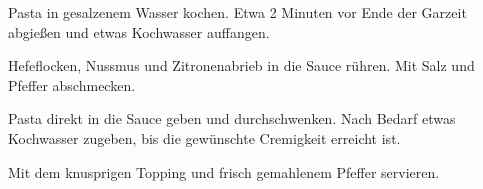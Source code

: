 \begin{recipe}
{    \step%
    Pasta in gesalzenem Wasser kochen. Etwa 2 Minuten vor Ende der Garzeit abgießen und etwas Kochwasser auffangen.
    
    \step%
    Hefeflocken, Nussmus und Zitronenabrieb in die Sauce rühren. Mit Salz und Pfeffer abschmecken.
    
    \step%
    Pasta direkt in die Sauce geben und durchschwenken. Nach Bedarf etwas Kochwasser zugeben, bis die gewünschte Cremigkeit erreicht ist.
    
    \step%
    Mit dem knusprigen Topping und frisch gemahlenem Pfeffer servieren.
}


\end{recipe}